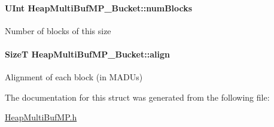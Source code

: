 \paragraph[{num\-Blocks}]{\setlength{\rightskip}{0pt plus 5cm}U\-Int Heap\-Multi\-Buf\-M\-P\-\_\-\-Bucket\-::num\-Blocks}\label{struct_heap_multi_buf_m_p___bucket_aae58960c7220dbf07d8eb41f09083b1c}
Number of blocks of this size 
\paragraph[{align}]{\setlength{\rightskip}{0pt plus 5cm}Size\-T Heap\-Multi\-Buf\-M\-P\-\_\-\-Bucket\-::align}\label{struct_heap_multi_buf_m_p___bucket_a0ca1421d9f65451f797e07811cefd80a}
Alignment of each block (in M\-A\-D\-Us) 

The documentation for this struct was generated from the following file\-:\begin{DoxyCompactItemize}
\item 
\hyperlink{_heap_multi_buf_m_p_8h}{Heap\-Multi\-Buf\-M\-P.\-h}\end{DoxyCompactItemize}
